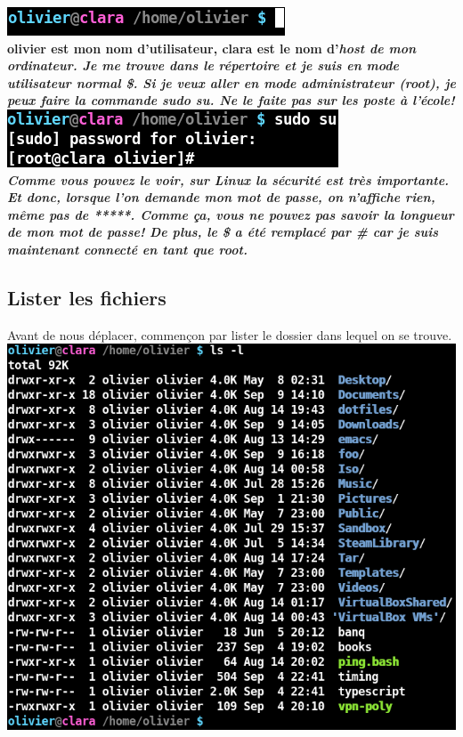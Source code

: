 \documentclass[12pt,oneside,final]{article}
\begin{document}
\includegraphics[scale=2]{bash_1} \\


\bf{olivier} est mon nom d'utilisateur, \bf{clara} est le nom
d'\it{host} de mon ordinateur. Je me trouve dans le répertoire
 et je suis en mode utilisateur normal \bf{\$}. Si
je veux aller en mode administrateur (\bf{root}), je peux faire la
commande \bf{sudo su}. Ne le faite pas sur les poste à l'école! \\

\includegraphics[scale=2]{bash_2} \\

Comme vous pouvez le voir, sur \it{Linux} la sécurité est très
importante. Et donc, lorsque l'on demande mon mot de passe, on n'affiche
rien, même pas de \bf{*****}. Comme ça, vous ne pouvez pas savoir la
longueur de mon mot de passe! De plus, le \bf{\$} a été remplacé par
\bf{\#} car je suis maintenant connecté en tant que \bf{root}.

\newpage
\subsection{Lister les fichiers}
Avant de nous déplacer, commençon par lister le dossier dans lequel on
se trouve. \\

\includegraphics[scale=2]{bash_ls} \\
\end{document}
